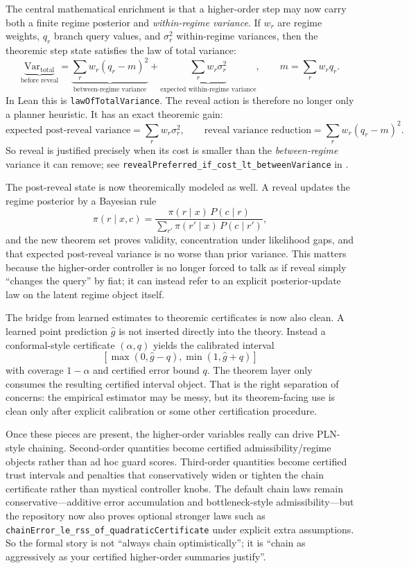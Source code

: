 \documentclass[11pt,openany]{report}
\begin{document}
The central mathematical enrichment is that a higher-order step may now carry
both a finite regime posterior and \emph{within-regime variance}.  If $w_r$ are
regime weights, $q_r$ branch query values, and $\sigma_r^2$ within-regime
variances, then the theoremic step state satisfies the law of total variance:
\[
  \underbrace{\mathrm{Var}_{\mathrm{total}}}_{\text{before reveal}}
  =
  \underbrace{\sum_r w_r (q_r - m)^2}_{\text{between-regime variance}}
  +
  \underbrace{\sum_r w_r \sigma_r^2}_{\text{expected within-regime variance}},
  \qquad
  m = \sum_r w_r q_r.
\]
In Lean this is \texttt{lawOfTotalVariance}.  The reveal action is therefore
no longer only a planner heuristic.  It has an exact theoremic gain:
\[
  \text{expected post-reveal variance}
  =
  \sum_r w_r \sigma_r^2,
  \qquad
  \text{reveal variance reduction}
  =
  \sum_r w_r (q_r - m)^2.
\]
So reveal is justified precisely when its cost is smaller than the
\emph{between-regime} variance it can remove; see
\texttt{revealPreferred\_if\_cost\_lt\_betweenVariance} in
.

The post-reveal state is now theoremically modeled as well.  A reveal updates
the regime posterior by a Bayesian rule
\[
  \pi(r \mid x, c)
  =
  \frac{\pi(r \mid x)\,P(c \mid r)}
       {\sum_{r'} \pi(r' \mid x)\,P(c \mid r')},
\]
and the new theorem set proves validity, concentration under likelihood
gaps, and that expected post-reveal variance is no worse than prior variance.
This matters because the higher-order controller is no longer forced to talk as
if reveal simply ``changes the query'' by fiat; it can instead refer to an
explicit posterior-update law on the latent regime object itself.

The bridge from learned estimates to theoremic certificates is now also clean.
A learned point prediction $\hat g$ is not inserted directly into the theory.
Instead a conformal-style certificate $(\alpha, q)$ yields the calibrated
interval
\[
  [\max(0,\hat g - q), \min(1,\hat g + q)]
\]
with coverage $1-\alpha$ and certified error bound $q$.  The theorem layer only
consumes the resulting certified interval object.  That is the right separation
of concerns: the empirical estimator may be messy, but its theorem-facing use
is clean only after explicit calibration or some other certification procedure.

Once these pieces are present, the higher-order variables really can drive
PLN-style chaining.  Second-order quantities become certified
admissibility/regime objects rather than ad hoc guard scores.  Third-order
quantities become certified trust intervals and penalties that conservatively
widen or tighten the chain certificate rather than mystical controller knobs.
The default chain laws remain conservative---additive error accumulation and
bottleneck-style admissibility---but the repository now also proves optional
stronger laws such as
\texttt{chainError\_le\_rss\_of\_quadraticCertificate} under explicit extra
assumptions.  So the formal story is not ``always chain optimistically''; it is
``chain as aggressively as your certified higher-order summaries justify''.
\end{document}
